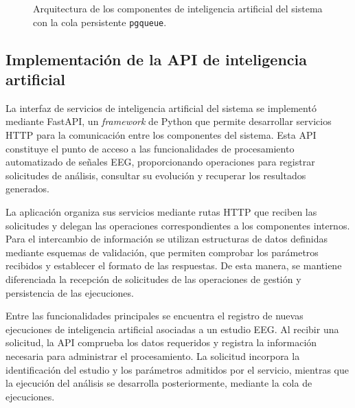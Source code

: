 \begin{figure}[p]

    \caption{Arquitectura de los componentes de
inteligencia artificial del sistema
con la cola persistente \texttt{pgqueue}.}

    \label{fig:arquitectura-componentes-ia}
\end{figure}

\FloatBarrier


\subsection{Implementación de la API de inteligencia artificial}

La interfaz de servicios de inteligencia artificial
del sistema se implementó mediante FastAPI, un
\textit{framework} de Python que permite desarrollar
servicios HTTP para la comunicación entre los
componentes del sistema. Esta API constituye
el punto de acceso a las funcionalidades de
procesamiento automatizado de señales EEG,
proporcionando operaciones para registrar
solicitudes de análisis, consultar su evolución
y recuperar los resultados generados.

La aplicación organiza sus servicios mediante
rutas HTTP que reciben las solicitudes y
delegan las operaciones correspondientes a
los componentes internos. Para el intercambio
de información se utilizan estructuras de
datos definidas mediante esquemas de validación,
que permiten comprobar los parámetros recibidos
y establecer el formato de las respuestas.
De esta manera, se mantiene diferenciada
la recepción de solicitudes de las operaciones
de gestión y persistencia de las ejecuciones.

Entre las funcionalidades principales se
encuentra el registro de nuevas ejecuciones
de inteligencia artificial asociadas a un
estudio EEG. Al recibir una solicitud, la API
comprueba los datos requeridos y registra
la información necesaria para administrar
el procesamiento. La solicitud incorpora
la identificación del estudio y los parámetros
admitidos por el servicio, mientras que
la ejecución del análisis se desarrolla
posteriormente, mediante la cola de ejecuciones.

